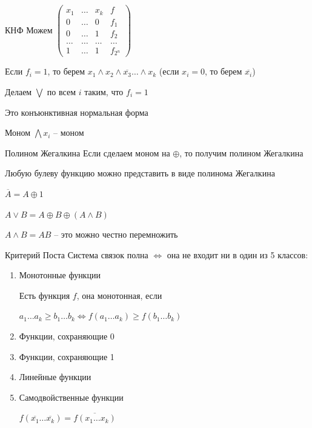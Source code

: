 \documentclass[12pt]{article}
\begin{document}
\begin{defin}{КНФ}
    Можем $\begin{pmatrix}
        x_1 & \ldots & x_k & f \\
        0 & \ldots & 0 & f_1 \\
        0 & \ldots & 1 & f_2 \\
        \ldots & \ldots & \ldots & \ldots \\
        1 & \ldots & 1 & f_{2^n}
    \end{pmatrix}$
    
    Если $f_i = 1$, то берем $x_1 \land x_2 \land \overline{x_3} \ldots \land x_k$ (если $x_i = 0$, то берем $\overline{x_i}$)
    
    Делаем $\bigvee$ по всем $i$ таким, что $f_i = 1$
    
    Это конъюнктивная нормальная форма
\end{defin}

\begin{defin}{Моном}
    $\bigwedge x_i$ -- моном
\end{defin}

\begin{defin}{Полином Жегалкина}
    Если сделаем моном на $\oplus$, то получим полином Жегалкина
\end{defin}

\begin{theo}{}
    Любую булеву функцию можно представить в виде полинома Жегалкина
\end{theo}

\begin{Proof}{}

$\overline{A} = A \oplus 1$

$A \lor B = A \oplus B \oplus (A \land B)$

$A \land B = AB$ -- это можно честно перемножить

\end{Proof}

\begin{theo}{Критерий Поста}
    Система связок полна $\Leftrightarrow$ она не входит ни в один из 5 классов:

    \begin{enumerate}
        \item Монотонные функции
        
        Есть функция $f$, она монотонная, если 
        
        $a_1 \ldots a_k \geq b_1 \ldots b_k \Leftrightarrow f(a_1 \ldots a_k) \geq f(b_1 \ldots b_k)$

        \item Функции, сохраняющие 0
        \item Функции, сохраняющие 1
        \item Линейные функции 
        \item Самодвойственные функции
        
        $f(\overline{x_1} \ldots \overline{x_k}) = \overline{f(x_1 \ldots x_k)}$
    \end{enumerate}
\end{theo}
\end{document}
